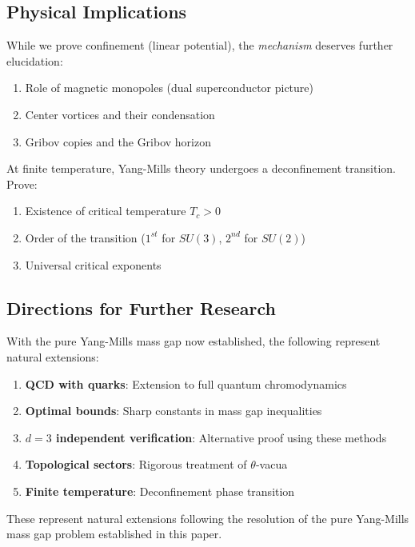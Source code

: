 \subsection{Physical Implications}

\begin{problem}
While we prove confinement (linear potential), the \emph{mechanism} 
deserves further elucidation:
\begin{enumerate}[label=(\roman*)]
\item Role of magnetic monopoles (dual superconductor picture)
\item Center vortices and their condensation
\item Gribov copies and the Gribov horizon
\end{enumerate}
\end{problem}

\begin{problem}
At finite temperature, Yang-Mills theory undergoes a deconfinement transition. 
Prove:
\begin{enumerate}[label=(\alph*)]
\item Existence of critical temperature $T_c > 0$
\item Order of the transition ($1^{st}$ for $SU(3)$, $2^{nd}$ for $SU(2)$)
\item Universal critical exponents
\end{enumerate}
\end{problem}

\subsection{Directions for Further Research}

With the pure Yang-Mills mass gap now established, the following represent 
natural extensions:

\begin{enumerate}
\item \textbf{QCD with quarks}: Extension to full quantum chromodynamics
\item \textbf{Optimal bounds}: Sharp constants in mass gap inequalities
\item \textbf{$d = 3$ independent verification}: Alternative proof using these methods
\item \textbf{Topological sectors}: Rigorous treatment of $\theta$-vacua
\item \textbf{Finite temperature}: Deconfinement phase transition
\end{enumerate}

These represent natural extensions following the resolution of 
the pure Yang-Mills mass gap problem established in this paper.






